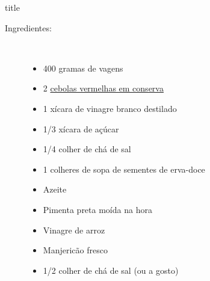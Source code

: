 \documentclass [11pt, letterpaper] {article}
\begin{document}
 {title}

\begin {description}

\item [Ingredientes:] \ \\
\begin {itemize}
\item 400  gramas de vagens
\item 2 \href{PickledRedOnions.html}{cebolas vermelhas em conserva}
\item 1 xícara de vinagre branco destilado
\item 1/3 xícara de açúcar
\item 1/4 colher de chá de sal
\item 1 colheres de sopa de sementes de erva-doce
\item Azeite
\item Pimenta preta mo\'ida na hora
\item Vinagre de arroz
\item Manjericão fresco
\item 1/2 colher de chá de sal (ou a gosto)
\end {itemize}


\end{description}
\end{document}
